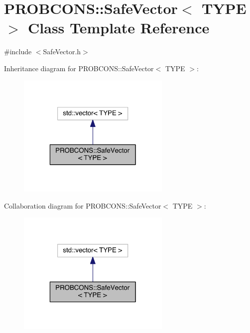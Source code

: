 \hypertarget{class_p_r_o_b_c_o_n_s_1_1_safe_vector}{\section{P\+R\+O\+B\+C\+O\+N\+S\+:\+:Safe\+Vector$<$ T\+Y\+P\+E $>$ Class Template Reference}
\label{class_p_r_o_b_c_o_n_s_1_1_safe_vector}
}


{\ttfamily \#include $<$Safe\+Vector.\+h$>$}



Inheritance diagram for P\+R\+O\+B\+C\+O\+N\+S\+:\+:Safe\+Vector$<$ T\+Y\+P\+E $>$\+:
\nopagebreak
\begin{figure}[H]
\begin{center}
\leavevmode
\includegraphics[width=208pt]{class_p_r_o_b_c_o_n_s_1_1_safe_vector__inherit__graph}
\end{center}
\end{figure}


Collaboration diagram for P\+R\+O\+B\+C\+O\+N\+S\+:\+:Safe\+Vector$<$ T\+Y\+P\+E $>$\+:
\nopagebreak
\begin{figure}[H]
\begin{center}
\leavevmode
\includegraphics[width=208pt]{class_p_r_o_b_c_o_n_s_1_1_safe_vector__coll__graph}
\end{center}
\end{figure}
